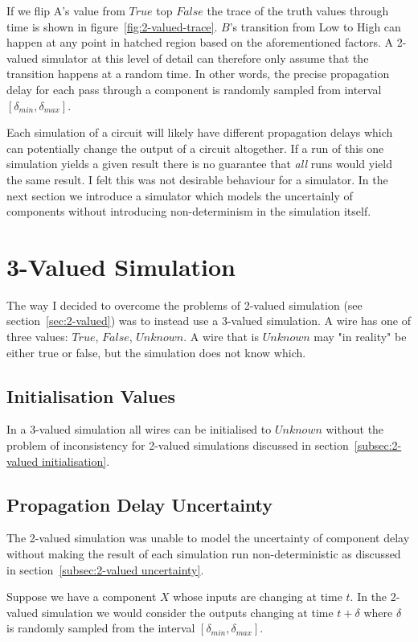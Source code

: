 If we flip A's value from $True$ top $False$ the trace of the truth values through time is shown in figure~\ref{fig:2-valued-trace}. $B$'s transition from Low to High can happen at any point in hatched region based on the aforementioned factors. A 2-valued simulator at this level of detail can therefore only assume that the transition happens at a random time. In other words, the precise propagation delay for each pass through a component is randomly sampled from interval $[\delta_{min}, \delta_{max}]$.

Each simulation of a circuit will likely have different propagation delays which can potentially change the output of a circuit altogether. If a run of this one simulation yields a given result there is no guarantee that \textit{all} runs would yield the same result. I felt this was not desirable behaviour for a simulator. In the next section we introduce a simulator which models the uncertainly of components without introducing non-determinism in the simulation itself.

\section{3-Valued Simulation}
\label{sec:3-valued}
The way I decided to overcome the problems of 2-valued simulation (see section~\ref{sec:2-valued}) was to instead use a 3-valued simulation. A wire has one of three values: $True$, $False$, $Unknown$. A wire that is $Unknown$ may "in reality" be either true or false, but the simulation does not know which.

\subsection{Initialisation Values}
In a 3-valued simulation all wires can be initialised to $Unknown$ without the problem of inconsistency for 2-valued simulations discussed in section~\ref{subsec:2-valued initialisation}.

\subsection{Propagation Delay Uncertainty}
\label{subsec:3-valued uncertainty}
The 2-valued simulation was unable to model the uncertainty of component delay without making the result of each simulation run non-deterministic as discussed in section~\ref{subsec:2-valued uncertainty}.

Suppose we have a component $X$ whose inputs are changing at time $t$. In the 2-valued simulation we would consider the outputs changing at time $t + \delta$ where $\delta$ is randomly sampled from the interval $[\delta_{min}, \delta_{max}]$. 

